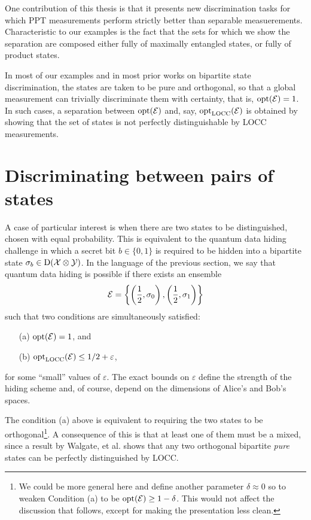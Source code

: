One contribution of this thesis is that it presents new discrimination tasks for which 
PPT measurements perform strictly better than separable measuerements.
Characteristic to our examples is the fact that the sets for which we show the separation
are composed either fully of maximally entangled states, or fully of product states. 

In most of our examples and in most prior works on bipartite state discrimination, 
the states are taken to be pure and orthogonal, so that a global measurement can 
trivially discriminate them with certainty, that is, $\operatorname{opt}(\mathcal{E}) = 1$.
In such cases, a separation between $\operatorname{opt}(\mathcal{E})$ and, say, $\operatorname{opt}_{\mathrm{LOCC}}(\mathcal{E})$ is obtained 
by showing that the set of states is not perfectly distinguishable by LOCC measurements.


\section{Discriminating between pairs of states}
A case of particular interest is when there are two states to be distinguished,
chosen with equal probability. 
This is equivalent to the quantum data hiding challenge in which a secret bit 
$b \in \{0,1\}$ is required to be hidden into a bipartite state 
$\sigma_{b}\in\mathrm{D}(\mathcal{X}\otimes\mathcal{Y})$. In the language of the previous section, 
we say that quantum data hiding is possible if there exists an ensemble
\begin{equation}
\mathcal{E} = \left\{\left(\frac{1}{2},\sigma_{0}\right),
        \left(\frac{1}{2},\sigma_{1}\right)\right\}
\end{equation}
such that two conditions are simultaneously satisfied:
\begin{itemize}
\item[(a)] $\operatorname{opt}(\mathcal{E}) = 1$, and
\item[(b)] $\operatorname{opt}_{\mathrm{LOCC}}(\mathcal{E}) \leq 1/2 + \varepsilon$,
\end{itemize}
for some ``small'' values of $\varepsilon$. The exact bounds on 
$\varepsilon$ define the strength of the hiding scheme and, 
of course, depend on the dimensions of Alice's and Bob's spaces.

The condition (a) above is equivalent to requiring the two states to be 
orthogonal\footnote{We could be more general here and define another parameter
$\delta \approx 0$ so to weaken Condition (a) to be $\operatorname{opt}(\mathcal{E}) \geq 1 - \delta$.
This would not affect the discussion that follows, except for making the 
presentation less clean.}.
A consequence of this is that at least one of them must be a mixed,
since a result by Walgate, et al. \cite{Walgate00} shows that any two orthogonal 
bipartite \emph{pure} states can be perfectly distinguished by LOCC.

